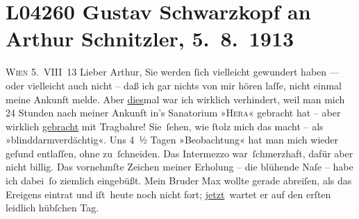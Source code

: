 

\section[Gustav Schwarzkopf an Arthur Schnitzler, 5. 8. 1913]{L04260 Gustav Schwarzkopf an Arthur Schnitzler, 5. 8. 1913}
\nopagebreak{}
\rehead{ }\normalsize\beginnumbering{}
\toendnotes[C]{\smallbreak\pagebreak[2]}
\toendnotes[C]{\smallbreak}
\toendnotes[C]{\smallbreak}
\pstart
           {\pb}\textsc{Wien}{ }5. VIII 13\pend
           \vspace{0.5em}
\pstart
           Lieber Arthur, Sie werden{ }ſich vielleicht gewundert haben — oder
               vielleicht auch nicht – daß ich gar nichts von mir hören laſſe, nicht einmal meine
               Ankunft melde. Aber \uline{dies}mal war ich wirklich
               verhindert, weil man mich 24 Stunden nach meiner Ankunft in’s Sanatorium »\textsc{Hera}« gebracht hat – aber wirklich \uline{gebracht} mit
               Tragbahre! Sie ſehen, wie{ }ſtolz mich das macht – als »blinddarmverdächtig«. Uns 4 ½
               Tagen »Beobachtung« hat man mich wieder geſund entlaſſen, ohne zu ſchneiden. Das
               Intermezzo war ſchmerzhaft, dafür aber nicht billig. {\pb}Das vornehmſte Zeichen meiner Erholung –
               die blühende Naſe – habe ich dabei ſo ziemlich eingebüßt. Mein Bruder Max wollte gerade abreiſen, als das Ereigens
               eintrat und iſt heute noch nicht fort; \uline{jetzt} wartet
               er auf den erſten leidlich hübſchen Tag.\pend
           
